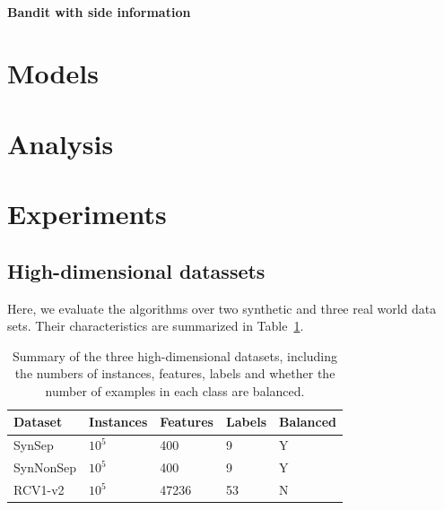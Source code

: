\documentclass[preprint,12pt,authoryear]{elsarticle}
\begin{document}
\paragraph{Bandit with side information}




\section{Models}

\section{Analysis}

\section{Experiments}

\subsection{High-dimensional datassets}
\label{subsec:BPAE}
Here, we evaluate the algorithms over two synthetic and three real world data sets. Their characteristics are summarized in Table~\ref{table:mce}.

\begin{table}[h]
	\caption{Summary of the three high-dimensional datasets, including the numbers of instances, features, labels and whether the number of examples in each class are balanced.}
	\label{table:mce}
	\begin{center}
		\begin{tabular}{l l l l l}
			{\bf Dataset}  & {\bf Instances} & {\bf Features} & {\bf Labels}& {\bf Balanced}\\
			\hline
			SynSep & $10^5$ 	& 400 	& 9 & Y\\
			
			SynNonSep & $10^5$ & 400 	& 9 & Y\\
			
			RCV1-v2  & $10^5$ 	& 47236 	& 53 & N\\
			
			
		\end{tabular}
	\end{center}
\end{table}
\end{document}
